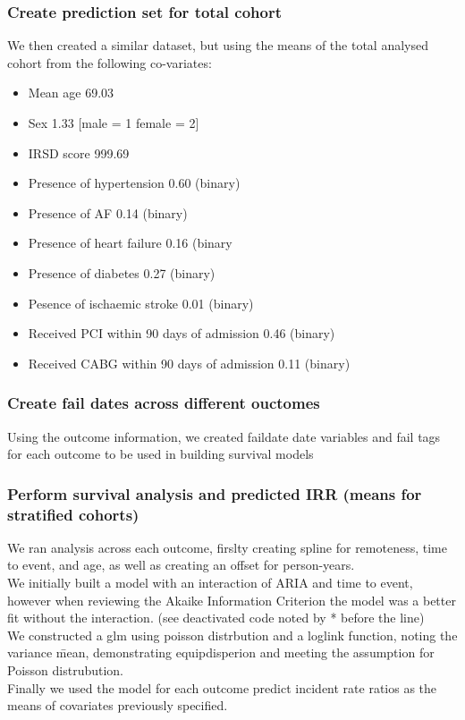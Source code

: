 \documentclass[11pt]{article}
\begin{document}
\subsubsection{Create prediction set for total cohort}
We then created a similar dataset, but using the means of the total analysed cohort from the following co-variates:
\begin{itemize}
\item Mean age 69.03
\item Sex 1.33 [male = 1 female = 2]
\item IRSD score 999.69
\item Presence of hypertension 0.60 (binary)
\item Presence of AF 0.14 (binary)
\item Presence of heart failure 0.16 (binary
\item Presence of diabetes 0.27 (binary)
\item Pesence of ischaemic stroke 0.01 (binary)
\item Received PCI within 90 days of admission 0.46 (binary)
\item Received CABG within 90 days of admission 0.11 (binary)
\end{itemize}
\color{violet}
\begin{stlog}\end{stlog}
\color{black}
\subsubsection{Create fail dates across different ouctomes}
Using the outcome information, we created faildate date variables and fail tags for each outcome to be used in building survival models
\color{violet}
\begin{stlog}\end{stlog}
\color{black}
\subsubsection{Perform survival analysis and predicted IRR (means for stratified cohorts)}
We ran analysis across each outcome, firslty creating spline for remoteness, time to event, and age, as well as creating an offset for person-years. \\
We initially built a model with an interaction of ARIA and time to event, however when reviewing the Akaike Information Criterion the model was a better fit without the interaction. (see deactivated code noted by * before the line)\\
We constructed a glm using poisson distrbution and a loglink function, noting the variance \= mean, demonstrating equipdisperion and meeting the assumption for Poisson distrubution. \\
Finally we used the model for each outcome predict incident rate ratios as the means of covariates previously specified. 
\color{violet}
\begin{stlog}\end{stlog}
\color{black}
\end{document}
